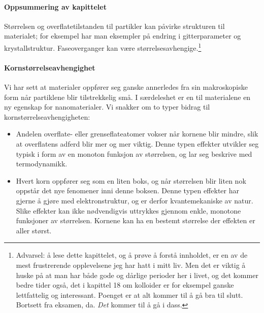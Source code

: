 \paragraph{Oppsummering av kapittelet} Størrelsen og overflatetilstanden til partikler kan påvirke strukturen til materialet; for eksempel har man eksempler på endring i gitterparameter og krystallstruktur. Faseoverganger kan være størrelsesavhengige.\footnote{Advarsel: å lese dette kapittelet, og å prøve å forstå innholdet, er en av de mest frustrerende opplevelsene jeg har hatt i mitt liv. Men det er viktig å huske på at man har både gode og dårlige perioder her i livet, og det kommer bedre tider også, det i kapittel 18 om kolloider er for eksempel ganske lettfattelig og interessant. Poenget er at alt kommer til å gå bra til slutt. Bortsett fra eksamen, da. \emph{Det} kommer til å gå i dass.}

\paragraph{Kornstørrelseavhengighet} Vi har sett at materialer oppfører seg ganske annerledes fra sin makroskopiske form når partiklene blir tilstrekkelig små. I særdeleshet er en til materialene en ny egenskap for nanomaterialer. Vi snakker om to typer bidrag til kornstørrelseavhengigheten:
\begin{itemize}
	\item Andelen overflate- eller grenseflateatomer vokser når kornene blir mindre, slik at overflatens adferd blir mer og mer viktig. Denne typen effekter utvikler seg typisk i form av en monoton funksjon av størrelsen, og lar seg beskrive med termodynamikk.
	\item Hvert korn oppfører seg som en liten boks, og når størrelsen blir liten nok oppstår det nye fenomener inni denne boksen. Denne typen effekter har gjerne å gjøre med elektronstruktur, og er derfor kvantemekaniske av natur. Slike effekter kan ikke nødvendigvis uttrykkes gjennom enkle, monotone funksjoner av størrelsen. Kornene kan ha en bestemt størrelse der effekten er aller størst. 
\end{itemize}

